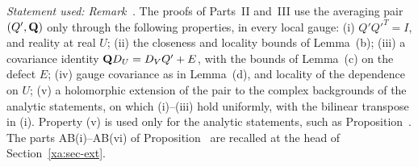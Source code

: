 \begin{detail}\label{xa:d-step-i}
\emph{Statement used: Remark~.} The proofs of Parts~II and~III use the averaging pair $(Q',\mathbf Q)$ only through the following properties, in every local gauge: (i) $Q'Q'^T=I$, and reality at real $U$; (ii) the closeness and locality bounds of Lemma~(b); (iii) a covariance identity $\mathbf Q D_U=D_VQ'+E$, with the bounds of Lemma~(c) on the defect $E$; (iv) gauge covariance as in Lemma~(d), and locality of the dependence on $U$; (v) a holomorphic extension of the pair to the complex backgrounds of the analytic statements, on which (i)--(iii) hold uniformly, with the bilinear transpose in (i). Property (v) is used only for the analytic statements, such as Proposition~. The parts AB(i)--AB(vi) of Proposition~ are recalled at the head of Section~\ref{xa:sec-ext}.


\end{detail}
